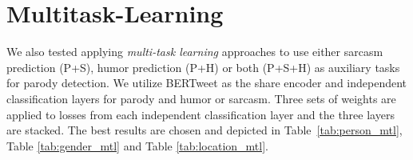 \documentclass[11pt]{article}
\begin{document}


\section{Multitask-Learning}
\label{appendix_MTL}
We also tested applying \emph{multi-task learning} approaches \citep{Caruana93multitasklearning:} to use either sarcasm prediction (P+S), humor prediction (P+H) or both (P+S+H) as auxiliary tasks for parody detection. We utilize BERTweet as the share encoder and independent classification layers for parody and humor or sarcasm. %
Three sets of weights are applied to losses from each independent classification layer and the three layers are stacked.
The best results are chosen and depicted in Table~\ref{tab:person_mtl}, Table \ref{tab:gender_mtl} and Table \ref{tab:location_mtl}.
\end{document}
